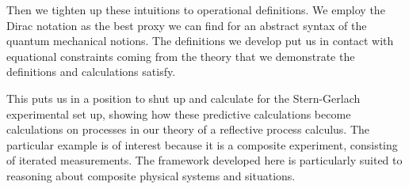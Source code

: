 Then we tighten up these intuitions to operational definitions. We
employ the Dirac notation as the best proxy we can find for an
abstract syntax of the quantum mechanical notions. The definitions we
develop put us in contact with equational constraints coming from the
theory that we demonstrate the definitions and calculations satisfy.

This puts us in a position to shut up and calculate for the
Stern-Gerlach experimental set up, showing how these predictive
calculations become calculations on processes in our theory of a
reflective process calculus. The particular example is of interest
because it is a composite experiment, consisting of iterated
measurements. The framework developed here is particularly suited to
reasoning about composite physical systems and situations.



